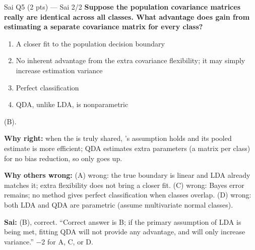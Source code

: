 \begin{qbox}{Sai Q5 (2 pts) --- Sai 2/2}
\textbf{Suppose the population covariance matrices really are identical across all classes. What advantage does  gain from estimating a separate covariance matrix for every class?}
\begin{enumerate}[label=(\Alph*),leftmargin=1.6em,itemsep=0pt]
\item A closer fit to the population decision boundary
\item No inherent advantage from the extra covariance flexibility; it may simply increase estimation variance
\item Perfect classification
\item QDA, unlike LDA, is nonparametric
\end{enumerate}
\ans (B).
\par\textbf{Why right:} when the  is truly shared, 's assumption holds and its pooled estimate is more efficient; QDA estimates extra parameters (a matrix per class) for no bias reduction, so only  goes up. 
\par\textbf{Why others wrong:}
(A) wrong: the true boundary is linear and LDA already matches it; extra flexibility does not bring a closer fit.
(C) wrong: Bayes error remains; no method gives perfect classification when classes overlap.
(D) wrong: both LDA and QDA are parametric (assume multivariate normal classes).
\par\textbf{\color{dblue}Sai:} (B), correct. \grader ``Correct answer is B; if the primary assumption of LDA is being met, fitting QDA will not provide any advantage, and will only increase variance.'' $-$2 for A, C, or D.
\end{qbox}


